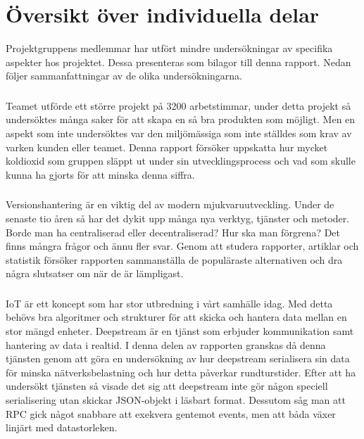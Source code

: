 \chapter{Översikt över individuella delar}
Projektgruppens medlemmar har utfört mindre undersökningar av specifika aspekter hos projektet. Dessa presenteras som bilagor till denna rapport. Nedan följer sammanfattningar av de olika undersökningarna.

\subsection*{}
Teamet utförde ett större projekt på 3200 arbetstimmar, under detta projekt så undersöktes många saker för att skapa en så bra produkten som möjligt. Men en aspekt som inte undersöktes var den miljömässiga som inte ställdes som krav av varken kunden eller teamet. Denna rapport försöker uppskatta hur mycket koldioxid som gruppen släppt ut under sin utvecklingsprocess och vad som skulle kunna ha gjorts för att minska denna siffra.

\subsection*{}
Versionshantering är en viktig del av modern mjukvaruutveckling. Under de senaste tio åren så har det dykit upp många nya verktyg, tjänster och metoder. Borde man ha centraliserad eller decentraliserad? Hur ska man förgrena? Det finns mångra frågor och ännu fler svar. Genom att studera rapporter, artiklar och statistik försöker rapporten sammanställa de populäraste alternativen och dra några slutsatser om när de är lämpligast.

\subsection*{}
IoT är ett koncept som har stor utbredning i vårt samhälle idag. Med detta behövs bra algoritmer och strukturer för att skicka och hantera data mellan en stor mängd enheter. Deepstream är en tjänst som erbjuder kommunikation samt hantering av data i realtid. I denna delen av rapporten granskas då denna tjänsten genom att göra en undersökning av hur deepstream serialisera sin data för minska nätverksbelastning och hur detta påverkar rundturstider. Efter att ha undersökt tjänsten så visade det sig att deepstream inte gör någon speciell serialisering utan skickar JSON-objekt i läsbart format. Dessutom såg man att RPC gick något snabbare att exekvera gentemot events, men att båda växer linjärt med datastorleken.

